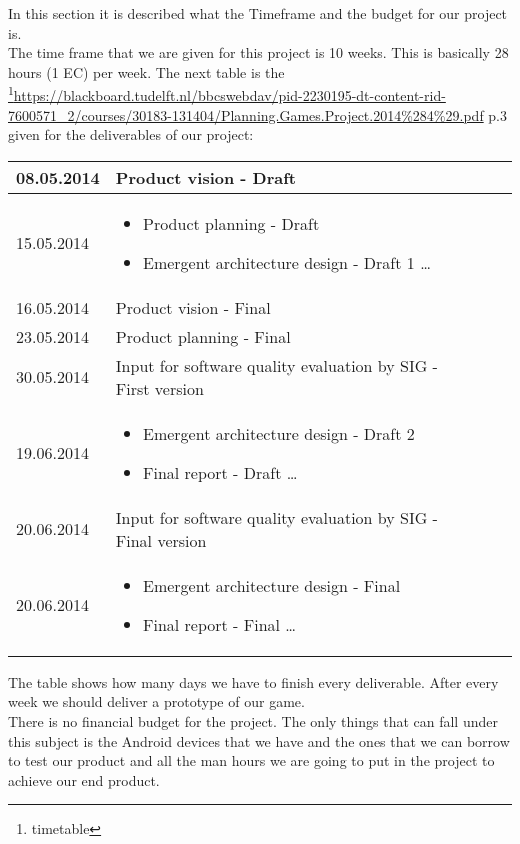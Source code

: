 In this section it is described what the Timeframe and the budget for our project is. \\
The time frame that we are given for this project is 10 weeks. This is basically 28 hours (1 EC) per week. 
The next table is the \footnote{timetable}{\url{https://blackboard.tudelft.nl/bbcswebdav/pid-2230195-dt-content-rid-7600571_2/courses/30183-131404/Planning.Games.Project.2014%284%29.pdf} p.3} given for the deliverables of our project:
\begin{center}
	\begin{tabular}{ p{5cm} l | p{10cm}  l }
		\hline
	 	08.05.2014 & Product vision - Draft \\ \hline
		15.05.2014 & 
		\begin{itemize}
			\item Product planning - Draft
			\item Emergent architecture design - Draft 1 \ldots
		\end{itemize} \\ \hline
		16.05.2014 & Product vision - Final \\ \hline
		23.05.2014 & Product planning - Final \\ \hline
		30.05.2014 & Input for software quality evaluation by SIG - First version \\ \hline
		19.06.2014 &
		\begin{itemize}
			\item Emergent architecture design - Draft 2
			\item Final report - Draft \ldots
		\end{itemize} \\ \hline
		20.06.2014 & Input for software quality evaluation by SIG - Final version \\ \hline
		20.06.2014 &
		\begin{itemize}
			\item Emergent architecture design - Final
			\item Final report - Final \ldots
		\end{itemize} \\
		\hline
	\end{tabular}
\end{center}
The table shows how many days we have to finish every deliverable. After every week we should deliver a prototype of our game. \\
\newline
There is no financial budget for the project. The only things that can fall under this subject is the Android devices that we have and the ones that we can borrow to test our product and all the man hours we are going to put in the project to achieve our end product.